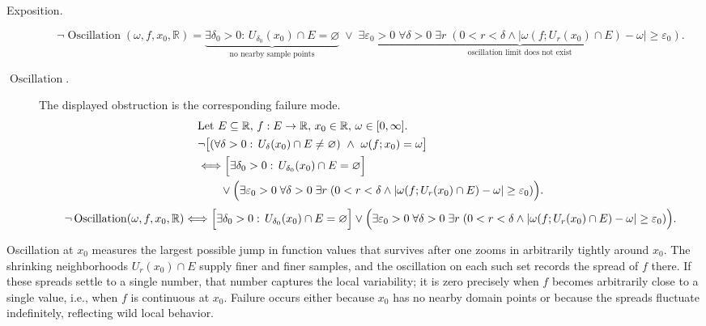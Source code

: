 \begin{remark*}
\begin{description}
  \item[Exposition.]
\[
\neg\operatorname{Oscillation}(\omega,f,x_0,\mathbb{R})
=
\underbrace{\exists \delta_0>0:\, U_{\delta_0}(x_0)\cap E = \varnothing}_{\text{no nearby sample points}}
\;\lor\;
\underbrace{\exists \varepsilon_0>0\; \forall \delta>0\; \exists r\;(0<r<\delta \land |\omega(f;U_r(x_0)\cap E)-\omega| \ge \varepsilon_0)}_{\text{oscillation limit does not exist}}.
\]


  \item[\(\operatorname{Oscillation}.\)]
  The displayed obstruction is the corresponding failure mode.
  \[
\begin{aligned}
&\text{Let } E \subseteq \mathbb{R},\, f:E \to \mathbb{R},\, x_0 \in \mathbb{R},\, \omega \in [0,\infty].\\
&\neg\bigl[(\forall \delta>0:\, U_\delta(x_0)\cap E \neq \varnothing)\ \land\ \omega(f;x_0)=\omega\bigr]\\
&\Longleftrightarrow
\Bigl[\exists \delta_0>0:\, U_{\delta_0}(x_0)\cap E = \varnothing\Bigr]\\
&\qquad\lor
\Bigl(\exists \varepsilon_0>0\; \forall \delta>0\; \exists r\;(0<r<\delta \land |\omega(f;U_r(x_0)\cap E)-\omega| \ge \varepsilon_0)\Bigr).
\end{aligned}
  \]
  \[
\neg\operatorname{Oscillation}(\omega,f,x_0,\mathbb{R})
\Longleftrightarrow
\Bigl[\exists \delta_0>0:\, U_{\delta_0}(x_0)\cap E = \varnothing\Bigr]
\lor
\Bigl(\exists \varepsilon_0>0\; \forall \delta>0\; \exists r\;(0<r<\delta \land |\omega(f;U_r(x_0)\cap E)-\omega| \ge \varepsilon_0)\Bigr).
  \]
\end{description}
\end{remark*}

\begin{remark*}[Interpretation]
Oscillation at $x_0$ measures the largest possible jump in function values that survives after one zooms in arbitrarily tightly around $x_0$. The shrinking neighborhoods $U_r(x_0)\cap E$ supply finer and finer samples, and the oscillation on each such set records the spread of $f$ there. If these spreads settle to a single number, that number captures the local variability; it is zero precisely when $f$ becomes arbitrarily close to a single value, i.e., when $f$ is continuous at $x_0$. Failure occurs either because $x_0$ has no nearby domain points or because the spreads fluctuate indefinitely, reflecting wild local behavior.
\end{remark*}

